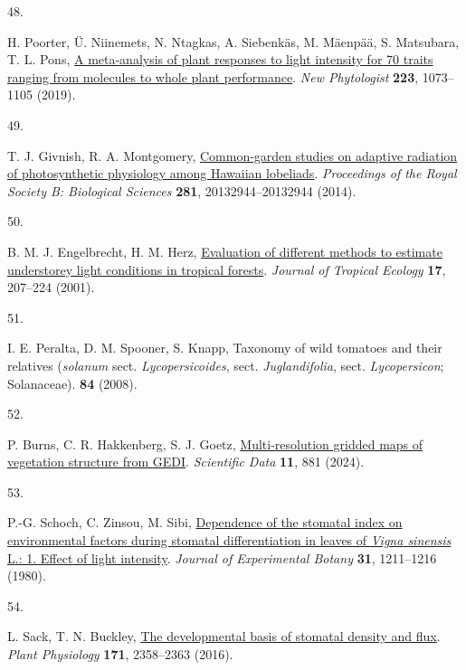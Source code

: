 \documentclass[
  letterpaper,
  DIV=11,
  numbers=noendperiod]{scrartcl}
\newlength{\cslhangindent}
\newlength{\csllabelwidth}
\newenvironment{CSLReferences}[2] %
 {\begin{list}{}{%
  \setlength{\itemindent}{0pt}
  \setlength{\leftmargin}{0pt}
  \setlength{\parsep}{0pt}
  \ifodd #1
   \setlength{\leftmargin}{\cslhangindent}
   \setlength{\itemindent}{-1\cslhangindent}
  \fi
  \setlength{\itemsep}{#2\baselineskip}}}
 {\end{list}}
\newcommand{\CSLLeftMargin}[1]{\parbox[t]{\csllabelwidth}{\strut#1\strut}}
\newcommand{\CSLRightInline}[1]{\parbox[t]{\linewidth - \csllabelwidth}{\strut#1\strut}}
\begin{document}
\begin{CSLReferences}{0}{1}
\CSLLeftMargin{48. }%
\CSLRightInline{H. Poorter, Ü. Niinemets, N. Ntagkas, A. Siebenkäs, M.
Mäenpää, S. Matsubara, T. L. Pons,
\href{https://doi.org/10.1111/nph.15754}{A meta‐analysis of plant
responses to light intensity for 70 traits ranging from molecules to
whole plant performance}. \emph{New Phytologist} \textbf{223},
1073--1105 (2019).}

\CSLLeftMargin{49. }%
\CSLRightInline{T. J. Givnish, R. A. Montgomery,
\href{https://doi.org/10.1098/rspb.2013.2944}{Common-garden studies on
adaptive radiation of photosynthetic physiology among {Hawaiian}
lobeliads}. \emph{Proceedings of the Royal Society B: Biological
Sciences} \textbf{281}, 20132944--20132944 (2014).}

\CSLLeftMargin{50. }%
\CSLRightInline{B. M. J. Engelbrecht, H. M. Herz,
\href{https://doi.org/10.1017/S0266467401001146}{Evaluation of different
methods to estimate understorey light conditions in tropical forests}.
\emph{Journal of Tropical Ecology} \textbf{17}, 207--224 (2001).}

\CSLLeftMargin{51. }%
\CSLRightInline{I. E. Peralta, D. M. Spooner, S. Knapp, Taxonomy of wild
tomatoes and their relatives (\emph{solanum} sect.
\emph{Lycopersicoides}, sect. \emph{Juglandifolia}, sect.
\emph{Lycopersicon}; {Solanaceae}). \textbf{84} (2008).}

\CSLLeftMargin{52. }%
\CSLRightInline{P. Burns, C. R. Hakkenberg, S. J. Goetz,
\href{https://doi.org/10.1038/s41597-024-03668-4}{Multi-resolution
gridded maps of vegetation structure from {GEDI}}. \emph{Scientific
Data} \textbf{11}, 881 (2024).}

\CSLLeftMargin{53. }%
\CSLRightInline{P.-G. Schoch, C. Zinsou, M. Sibi,
\href{https://doi.org/10.1093/jxb/31.5.1211}{Dependence of the stomatal
index on environmental factors during stomatal differentiation in leaves
of \emph{{Vigna} sinensis} {L}.: 1. {Effect} of light intensity}.
\emph{Journal of Experimental Botany} \textbf{31}, 1211--1216 (1980).}

\CSLLeftMargin{54. }%
\CSLRightInline{L. Sack, T. N. Buckley,
\href{https://doi.org/10.1104/pp.16.00476}{The developmental basis of
stomatal density and flux}. \emph{Plant Physiology} \textbf{171},
2358--2363 (2016).}


\end{CSLReferences}
\end{document}
